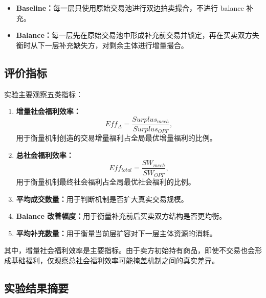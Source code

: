 \documentclass[UTF8,a4paper,12pt]{ctexart}
\begin{document}
\begin{itemize}
    \item \textbf{Baseline：}每一层只使用原始交易池进行双边拍卖撮合，不进行 balance 补充。
    \item \textbf{Balance：}每一层先在原始交易池中形成补充前交易并锁定，再在买卖双方失衡时从下一层补充缺失方，对剩余主体进行增量撮合。
\end{itemize}

\subsection{评价指标}

实验主要观察五类指标：

\begin{enumerate}
    \item \textbf{增量社会福利效率：}
          \[
              Eff_{\Delta}=
              \frac{Surplus_{mech}}{Surplus_{OPT}},
          \]
          用于衡量机制创造的交易增量福利占全局最优增量福利的比例。
    \item \textbf{总社会福利效率：}
          \[
              Eff_{total}=
              \frac{SW_{mech}}{SW_{OPT}},
          \]
          用于衡量机制最终社会福利占全局最优社会福利的比例。
    \item \textbf{平均成交数量：}用于判断机制是否扩大真实交易规模。
    \item \textbf{Balance 改善幅度：}用于衡量补充前后买卖双方结构是否更均衡。
    \item \textbf{平均补充数量：}用于衡量当前层扩容对下一层主体资源的消耗。
\end{enumerate}

其中，增量社会福利效率是主要指标。由于卖方初始持有商品，即使不交易也会形成基础福利，仅观察总社会福利效率可能掩盖机制之间的真实差异。

\subsection{实验结果摘要}
\end{document}
